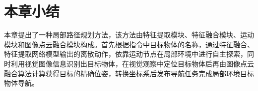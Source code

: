\section{本章小结}
本章提出了一种局部路径规划方法，该方法由特征提取模块、特征融合模块、运动模块和图像点云融合模块构成。首先根据指令中目标物体的名称，通过特征融合、特征提取网络模型输出的离散动作，依靠运动节点在局部环境中进行自主探索，同时利用视觉图像信息识别出目标物体，在视觉观察中定位目标物体后再由图像点云融合算法计算获得目标的精确位姿，转换坐标系后发布导航任务完成局部环境目标物体导航。
